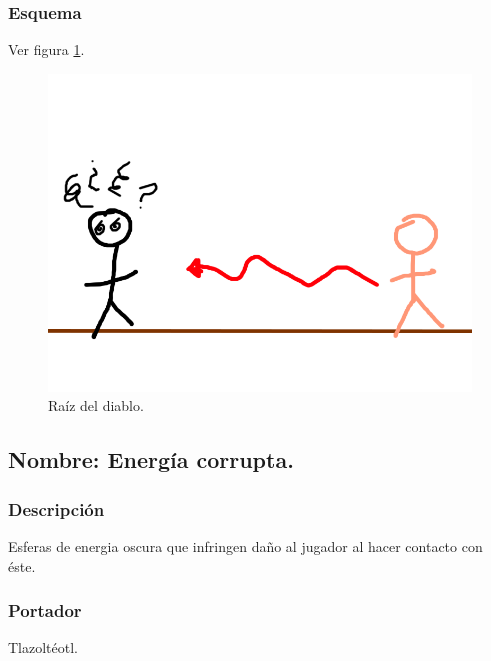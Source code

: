 \documentclass[11pt,letterpaper]{article}
\begin{document}
\subsubsection{Esquema}
			Ver figura \ref{fig:raiz}.
			\begin{figure}
				\centering
				\includegraphics[height=0.2 \textheight]{Imagenes/raiz}
				\caption{Raíz del diablo.}
				\label{fig:raiz}
			\end{figure}
\subsection{Nombre: Energía corrupta.}
\subsubsection{Descripción}
Esferas de energia oscura que infringen daño al jugador al hacer contacto con éste.
\subsubsection{Portador}
Tlazoltéotl.
\end{document}
